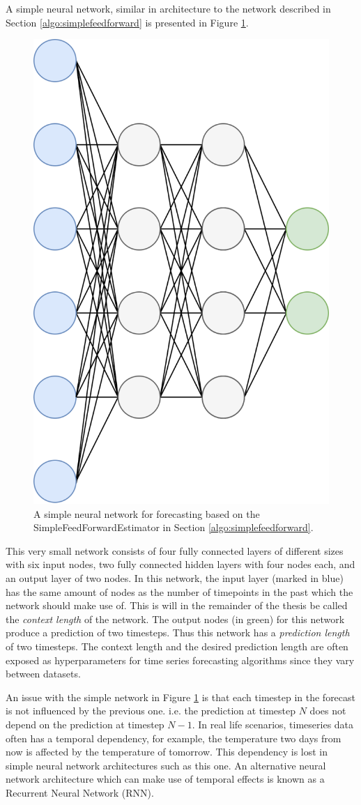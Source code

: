 A simple neural network, similar in architecture to the network described in Section \ref{algo:simplefeedforward} is presented in Figure \ref{fig:simplefeedforward}.

\begin{figure}[htb]
  \centering
  \includegraphics[width=0.5\linewidth]{./img/simplefeedforward.png}
  \caption{A simple neural network for forecasting based on the SimpleFeedForwardEstimator in Section \ref{algo:simplefeedforward}.}
  \label{fig:simplefeedforward}
\end{figure}
\clearpage

This very small network consists of four fully connected layers of different sizes with six input nodes, two fully connected hidden layers with four nodes each, and an output layer of two nodes. In this network, the input layer (marked in blue) has the same amount of nodes as the number of timepoints in the past which the network should make use of. This is will in the remainder of the thesis be called the \textit{context length} of the network. The output nodes (in green) for this network produce a prediction of two timesteps. Thus this network has a \textit{prediction length} of two timesteps. The context length and the desired prediction length are often exposed as hyperparameters for time series forecasting algorithms since they vary between datasets.

An issue with the simple network in Figure \ref{fig:simplefeedforward} is that each timestep in the forecast is not influenced by the previous one. i.e. the prediction at timestep \(N\) does not depend on the prediction at timestep \(N-1\). In real life scenarios, timeseries data often has a temporal dependency, for example, the temperature two days from now is affected by the temperature of tomorrow. This dependency is lost in simple neural network architectures such as this one. An alternative neural network architecture which can make use of temporal effects is known as a Recurrent Neural Network (RNN).

